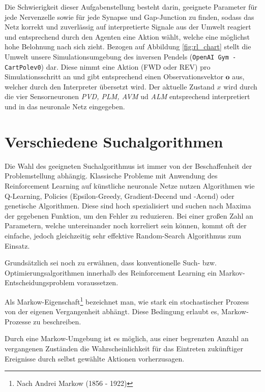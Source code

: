 	Die Schwierigkeit dieser Aufgabenstellung besteht darin, geeignete Parameter für jede Nervenzelle sowie für jede Synapse und Gap-Junction zu finden, sodass das Netz korrekt und zuverlässig auf interpretierte Signale aus der Umwelt reagiert und entsprechend durch den Agenten eine Aktion wählt, welche eine möglichst hohe Belohnung nach sich zieht. Bezogen auf Abbildung \ref{fig:rl_chart} stellt die Umwelt unsere Simulationsumgebung des inversen Pendels (\texttt{OpenAI Gym - CartPolev0}) dar. Diese nimmt eine Aktion (FWD oder REV) pro Simulationsschritt an und gibt entsprechend einen Observationsvektor $\textbf{o}$ aus, welcher durch den Interpreter übersetzt wird. Der aktuelle Zustand $x$ wird durch die vier Sensorneuronen \textit{PVD, PLM, AVM} ud \textit{ALM} entsprechend interpretiert und in das neuronale Netz eingegeben.

\section{Verschiedene Suchalgorithmen}
\label{sec:rl_alt}
	Die Wahl des geeigneten Suchalgorithmus ist immer von der Beschaffenheit der Problemstellung abhängig. Klassische Probleme mit Anwendung des Reinforcement Learning auf künstliche neuronale Netze nutzen Algorithmen wie Q-Learning, Policies (Epsilon-Greedy, Gradient-Decend und -Acend) oder genetische Algorithmen. Diese sind hoch spezialisiert und suchen nach Maxima der gegebenen Funktion, um den Fehler zu reduzieren. Bei einer großen Zahl an Parametern, welche untereinander noch korreliert sein können, kommt oft der einfache, jedoch gleichzeitig sehr effektive \glqq Random-Search\grqq{} Algorithmus zum Einsatz.
	
	Grundsätzlich sei noch zu erwähnen, dass konventionelle Such- bzw. Optimierungsalgorithmen innerhalb des Reinforcement Learning ein Markov-Entscheidungsproblem voraussetzen. 
	\begin{remark}
		Als Markow-Eigenschaft\footnote{Nach Andrei Markow (1856 - 1922)} bezeichnet man, wie stark ein stochastischer Prozess von der eigenen Vergangenheit abhängt. Diese Bedingung erlaubt es, Markow-Prozesse zu beschreiben.
		
		Durch eine Markow-Umgebung ist es möglich, aus einer begrenzten Anzahl an vergangenen Zuständen die Wahrscheinlichkeit für das Eintreten zukünftiger Ereignisse durch selbst gewählte Aktionen vorherzusagen. \cite{SilverRL}
	\end{remark}
	
